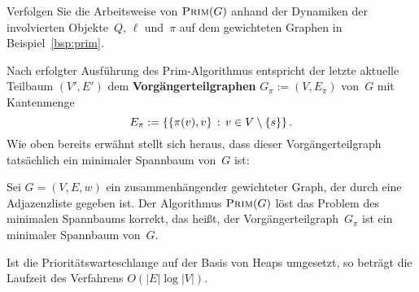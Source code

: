 \begin{aufg}
Verfolgen Sie die Arbeitsweise von $\mathop{\text{\textsc{Prim}}}(G)$ anhand der Dynamiken der involvierten Objekte~$Q$, $\ell$ und~$\pi$ auf dem gewichteten Graphen in Beispiel~\ref{bsp:prim}.
\end{aufg}

\begin{bem}
Nach erfolgter Ausführung des Prim-Algorithmus entspricht der letzte aktuelle Teilbaum $(V',E')$ dem \textbf{Vorgängerteilgraphen} $G_\pi := (V,E_\pi)$ von~$G$ mit Kantenmenge
\[
E_\pi := \left\{  \{\pi(v),v\} \,:\, v \in V \setminus \{s\} \right\}.
\]
Wie oben bereits erwähnt stellt sich heraus, dass dieser Vorgängerteilgraph tatsächlich ein minimaler Spannbaum von~$G$ ist:
\end{bem} 

\begin{thm}
\label{thm:prim-korrektheit}
Sei $G=(V,E,w)$ ein zusammenhängender gewichteter Graph, der durch eine Adjazenzliste gegeben ist. 
Der Algorithmus $\mathop{\text{\textsc{Prim}}}(G)$ löst das Problem des minimalen Spannbaums korrekt, das heißt, der Vorgängerteilgraph~$G_\pi$ ist ein minimaler Spannbaum von~$G$.

Ist die Prioritätswarteschlange auf der Basis von Heaps umgesetzt, so beträgt die Laufzeit des Verfahrens $O(|E| \log |V|)$. 
\end{thm}

